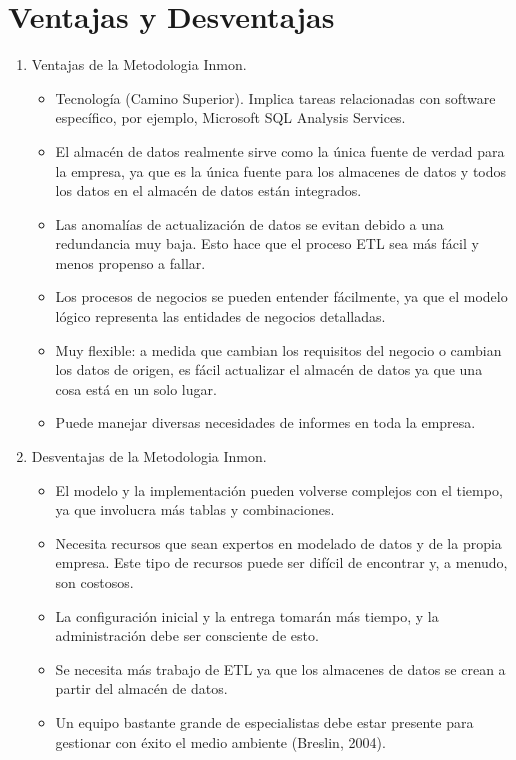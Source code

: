 \documentclass[preprint,12pt]{elsarticle}
\begin{document}
\section{Ventajas y Desventajas}
\begin{enumerate}[5.2]
    \item Ventajas de la Metodologia Inmon.
 \\
\begin{itemize}
\item Tecnología (Camino Superior). Implica tareas relacionadas con software específico, por ejemplo, Microsoft SQL Analysis Services.
\item El almacén de datos realmente sirve como la única fuente de verdad para la empresa, ya que es la única fuente para los almacenes de datos y todos los datos en el almacén de datos están integrados.
\item Las anomalías de actualización de datos se evitan debido a una redundancia muy baja. Esto hace que el proceso ETL sea más fácil y menos propenso a fallar.
\item Los procesos de negocios se pueden entender fácilmente, ya que el modelo lógico representa las entidades de negocios detalladas.
\item Muy flexible: a medida que cambian los requisitos del negocio o cambian los datos de origen, es fácil actualizar el almacén de datos ya que una cosa está en un solo lugar.
\item Puede manejar diversas necesidades de informes en toda la empresa.
\\
\end{itemize}
 \item Desventajas de la Metodologia Inmon.
\begin{itemize}

\item El modelo y la implementación pueden volverse complejos con el tiempo, ya que involucra más tablas y combinaciones.
\item Necesita recursos que sean expertos en modelado de datos y de la propia empresa. Este tipo de recursos puede ser difícil de encontrar y, a menudo, son costosos.
\item La configuración inicial y la entrega tomarán más tiempo, y la administración debe ser consciente de esto.
\item Se necesita más trabajo de ETL ya que los almacenes de datos se crean a partir del almacén de datos.
\item Un equipo bastante grande de especialistas debe estar presente para gestionar con éxito el medio ambiente (Breslin, 2004).
\end{itemize}


\end{enumerate}
\end{document}
